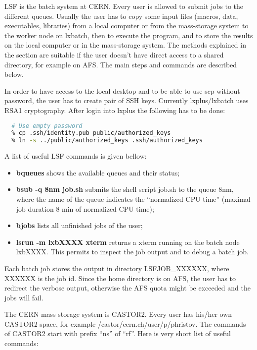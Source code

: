 \documentclass[12pt,a4paper,twoside]{article}
\begin{document}
LSF is the batch system at CERN. Every user is allowed to submit jobs
to the different queues. Usually the user has to copy some input files
(macros, data, executables, libraries) from a local computer or from
the mass-storage system to the worker node on lxbatch, then to execute
the program, and to store the results on the local computer or in the
mass-storage system. The methods explained in the section are suitable
if the user doesn't have direct access to a shared directory, for
example on AFS. The main steps and commands are described below.

In order to have access to the local desktop and to be able to use scp
without password, the user has to create pair of SSH keys. Currently
lxplus/lxbatch uses RSA1 cryptography. After login into lxplus the
following has to be done:

\begin{lstlisting}[language=sh]
  % ssh-keygen -t rsa1
  # Use empty password
  % cp .ssh/identity.pub public/authorized_keys
  % ln -s ../public/authorized_keys .ssh/authorized_keys
\end{lstlisting}

A list of useful LSF commands is given bellow:
\begin{itemize}
\item \textbf{bqueues} shows the available queues and their status;
\item \textbf{ bsub -q 8nm job.sh} submits the shell script job.sh to
  the queue 8nm, where the name of the queue indicates the
  ``normalized CPU time'' (maximal job duration 8 min of normalized CPU time);
\item \textbf{bjobs} lists all unfinished jobs of the user;
\item \textbf{lsrun -m lxbXXXX xterm} returns a xterm running on the
  batch node lxbXXXX. This permits to inspect the job output and to
  debug a batch job.
\end{itemize}

Each batch job stores the output in directory LSFJOB\_XXXXXX, where
XXXXXX is the job id. Since the home directory is on AFS, the user has
to redirect the verbose output, otherwise the AFS quota might be
exceeded and the jobs will fail.

The CERN mass storage system is CASTOR2\cite{CASTOR2}.  Every user has
his/her own CASTOR2 space, for example /castor/cern.ch/user/p/phristov.
The commands of CASTOR2 start with prefix ``ns'' of ``rf''. Here is
very short list of useful commands:
\end{document}
